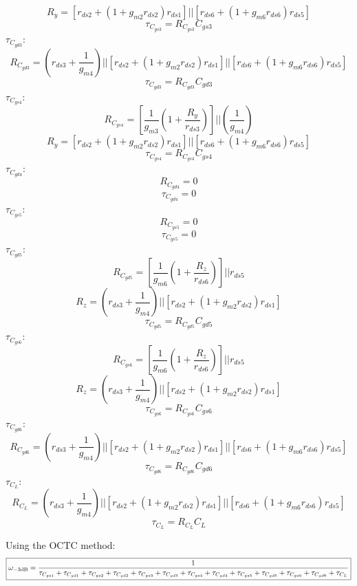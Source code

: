 \documentclass{article}
\begin{document}
$$R_y = \left[r_{ds2} + (1 + g_{m2}r_{ds2})r_{ds1}\right] || \left[r_{ds6} + (1 + g_{m6}r_{ds6})r_{ds5}\right]$$
$$\boxed{\tau_{C_{gs3}} = R_{C_{gs3}}C_{gs3}}$$
$\tau_{C_{gd3}}$:
$$R_{C_{gd3}} =  \left(r_{ds3} + \frac{1}{g_{m4}}\right) || \left[r_{ds2} + (1 + g_{m2}r_{ds2})r_{ds1}\right] || \left[r_{ds6} + (1 + g_{m6}r_{ds6})r_{ds5}\right]$$
$$\boxed{\tau_{C_{gd3}} = R_{C_{gd3}}C_{gd3}}$$
$\tau_{C_{gs4}}$:
$$R_{C_{gs4}} = \left[\frac{1}{g_{m3}}\left(1 + \frac{R_y}{r_{ds3}}\right)\right]||\left(\frac{1}{g_{m4}}\right)$$
$$R_y = \left[r_{ds2} + (1 + g_{m2}r_{ds2})r_{ds1}\right] || \left[r_{ds6} + (1 + g_{m6}r_{ds6})r_{ds5}\right]$$
$$\boxed{\tau_{C_{gs4}} = R_{C_{gs4}}C_{gs4}}$$
$\tau_{C_{gd4}}$:
$$R_{C_{gd4}} = 0$$
$$\boxed{\tau_{C_{gd4}} = 0}$$
$\tau_{C_{gs5}}$:
$$R_{C_{gs5}} = 0$$
$$\boxed{\tau_{C_{gs5}} = 0}$$
$\tau_{C_{gd5}}$:
$$R_{C_{gd5}} = \left[\frac{1}{g_{m6}}\left(1 + \frac{R_z}{r_{ds6}}\right)\right]||r_{ds5}$$
$$R_z = \left(r_{ds3} + \frac{1}{g_{m4}}\right) || \left[r_{ds2} + (1 + g_{m2}r_{ds2})r_{ds1}\right]$$
$$\boxed{\tau_{C_{gd5}} = R_{C_{gd5}}C_{gd5}}$$
$\tau_{C_{gs6}}$:
$$R_{C_{gs6}} = \left[\frac{1}{g_{m6}}\left(1 + \frac{R_z}{r_{ds6}}\right)\right]||r_{ds5}$$
$$R_z = \left(r_{ds3} + \frac{1}{g_{m4}}\right) || \left[r_{ds2} + (1 + g_{m2}r_{ds2})r_{ds1}\right]$$
$$\boxed{\tau_{C_{gs6}} = R_{C_{gs6}}C_{gs6}}$$
$\tau_{C_{gd6}}$:
$$R_{C_{gd6}} =  \left(r_{ds3} + \frac{1}{g_{m4}}\right) || \left[r_{ds2} + (1 + g_{m2}r_{ds2})r_{ds1}\right] || \left[r_{ds6} + (1 + g_{m6}r_{ds6})r_{ds5}\right]$$
$$\boxed{\tau_{C_{gd6}} = R_{C_{gd6}}C_{gd6}}$$
$\tau_{C_{L}}$:
$$R_{C_{L}} =  \left(r_{ds3} + \frac{1}{g_{m4}}\right) || \left[r_{ds2} + (1 + g_{m2}r_{ds2})r_{ds1}\right] || \left[r_{ds6} + (1 + g_{m6}r_{ds6})r_{ds5}\right]$$
$$\boxed{\tau_{C_{L}} = R_{C_{L}}C_{L}}$$

Using the OCTC method:
$$\boxed{\omega_{\rm -3dB} = \frac{1}{\tau_{C_{gs1}} + \tau_{C_{gd1}} + \tau_{C_{gs2}} + \tau_{C_{gd2}} + \tau_{C_{gs3}} + \tau_{C_{gd3}} + \tau_{C_{gs4}} + \tau_{C_{gd4}} + \tau_{C_{gs5}} + \tau_{C_{gd5}} + \tau_{C_{gs6}} + \tau_{C_{gd6}} + \tau_{C_L}}}$$
\newpage
\end{document}
